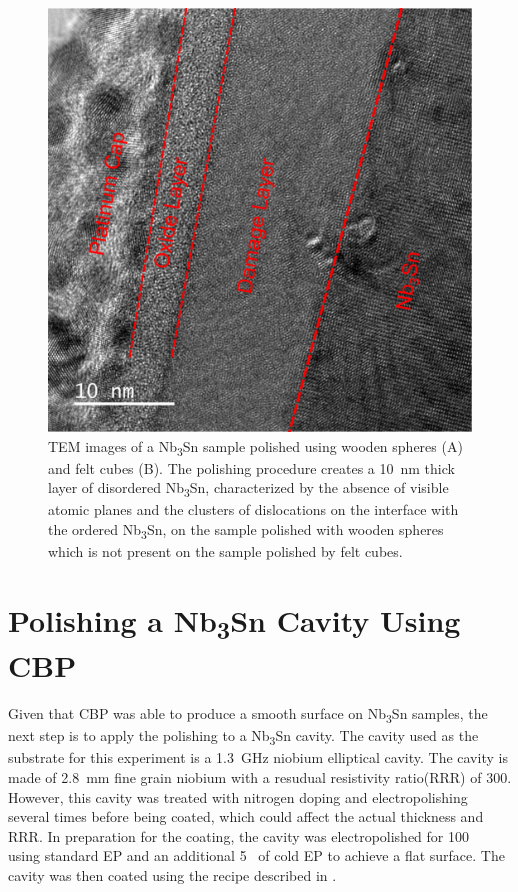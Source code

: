 \documentclass[reprint,amsmath,amssymb,aps]{revtex4-2}%
\begin{document}
\begin{figure}[t]%
\centering%
\includegraphics[width=0.8\columnwidth]{../doc/figs/Sample_Surface_Damage_Layer.png}%
\caption{TEM images of a Nb\textsubscript{3}Sn sample polished using wooden spheres (A) and felt cubes (B). The polishing procedure creates a 10~nm thick layer of disordered Nb\textsubscript{3}Sn, characterized by the absence of visible atomic planes and the clusters of dislocations on the interface with the ordered Nb\textsubscript{3}Sn, on the sample polished with wooden spheres which is not present on the sample polished by felt cubes.}%
\label{fig:samplesurfacedamagelayer}%
\end{figure}

%
\section{Polishing a Nb\textsubscript{3}Sn Cavity Using CBP}%
\label{sec:cavitycbp}%
Given that CBP was able to produce a smooth surface on Nb\textsubscript{3}Sn samples, the next step is to apply the polishing to a Nb\textsubscript{3}Sn cavity. The cavity used as the substrate for this experiment is a 1.3~GHz niobium elliptical cavity. The cavity is made of 2.8~mm fine grain niobium with a resudual resistivity ratio(RRR) of 300. However, this cavity was treated with nitrogen doping and electropolishing several times before being coated, which could affect the actual thickness and RRR. In preparation for the coating, the cavity was electropolished for 100~\si{\micrometers} using standard EP and an additional 5~\si{\micrometers} of cold EP to achieve a flat surface. The cavity was then coated using the recipe described in \cite{posen2017nb3sn}. 
\end{document}
